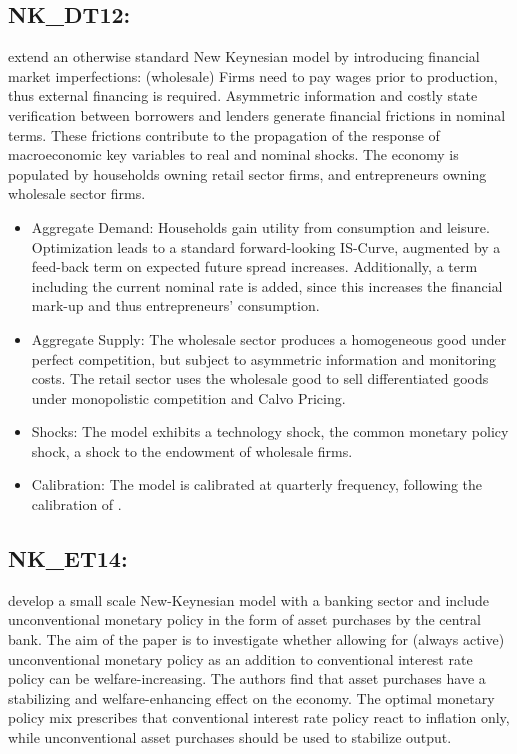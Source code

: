 \documentclass[11pt,a4paper]{article}
\begin{document}
	
	
	\subsection{NK\_DT12: \texorpdfstring{\cite{defiore2012tristani}}{De Fiore and Tristani (2013)}}
	\label{NKDT12}
	\cite{defiore2012tristani} extend an otherwise standard New Keynesian model by introducing financial market imperfections: (wholesale) Firms need to pay wages prior to production, thus external financing is required. Asymmetric information and costly state verification between borrowers and lenders generate financial frictions in nominal terms. These frictions contribute to the propagation of the response of macroeconomic key variables to real and nominal shocks. The economy is populated by households owning retail sector firms, and entrepreneurs owning wholesale sector firms.
	
	\begin{itemize}
		\item Aggregate Demand: Households gain utility from consumption and leisure. Optimization leads to a standard forward-looking IS-Curve, augmented by a feed-back term on expected future spread increases. Additionally, a term including the current nominal rate is added, since this increases the financial mark-up and thus entrepreneurs' consumption.
		\item Aggregate Supply: The wholesale sector produces a homogeneous good under perfect competition, but subject to asymmetric information and monitoring costs. The retail sector uses the wholesale good to sell differentiated goods under monopolistic competition and Calvo Pricing.
		\item Shocks: The model exhibits a technology shock, the common monetary policy shock, a shock to the endowment of wholesale firms.
		\item Calibration: The model is calibrated at quarterly frequency, following the calibration of \cite{Woodford2003}.
	\end{itemize}
	
	
	\subsection{NK\_ET14: \texorpdfstring{\cite{EllisonTischbirek2014}}{Ellison and Tischbirek (2014)}}
	\label{NKET14}
	\cite{EllisonTischbirek2014} develop a small scale New-Keynesian model with a banking sector and include unconventional monetary policy in the form of asset purchases by the central bank. The aim of the paper is to investigate whether allowing for (always active) unconventional monetary policy as an addition to conventional interest rate policy can be welfare-increasing. The authors find that asset purchases have a stabilizing and welfare-enhancing effect on the economy. The optimal monetary policy mix prescribes that conventional interest rate policy react to inflation only, while unconventional asset purchases should be used to stabilize output.
	
\end{document}
